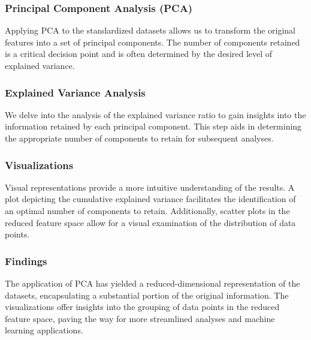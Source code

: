 \documentclass{article}
\begin{document}
\subsubsection{Principal Component Analysis (PCA)}
Applying PCA to the standardized datasets allows us to transform the original features into a set of principal components. The number of components retained is a critical decision point and is often determined by the desired level of explained variance.
\subsubsection{Explained Variance Analysis}
We delve into the analysis of the explained variance ratio to gain insights into the information retained by each principal component. This step aids in determining the appropriate number of components to retain for subsequent analyses.
\subsubsection{Visualizations}
Visual representations provide a more intuitive understanding of the results. A plot depicting the cumulative explained variance facilitates the identification of an optimal number of components to retain. Additionally, scatter plots in the reduced feature space allow for a visual examination of the distribution of data points.
\subsubsection{Findings}
The application of PCA has yielded a reduced-dimensional representation of the datasets, encapsulating a substantial portion of the original information. The visualizations offer insights into the grouping of data points in the reduced feature space, paving the way for more streamlined analyses and machine learning applications.
\end{document}
